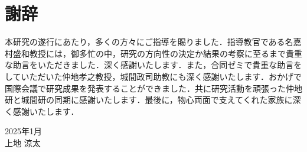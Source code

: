 \chapter*{謝辞}
\thispagestyle{empty}

本研究の遂行にあたり，多くの方々にご指導を賜りました．指導教官である名嘉村盛和教授には，御多忙の中，研究の方向性の決定か結果の考察に至るまで貴重な助言をいただきました．深く感謝いたします．また，合同ゼミで貴重な助言をしていただいた仲地孝之教授，城間政司助教にも深く感謝いたします．おかげで国際会議で研究成果を発表することができました．共に研究活動を頑張った仲地研と城間研の同期に感謝いたします．最後に，物心両面で支えてくれた家族に深く感謝いたします．

\hspace{1zw}
\begin{flushright}
 2025年1月\\
 上地 涼太
\end{flushright}